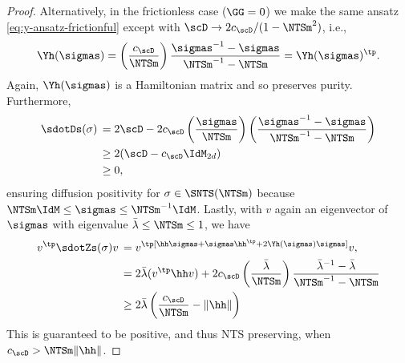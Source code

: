 \documentclass{article}
\numberwithin{equation}{section}
\begin{document}
\begin{proof}
Alternatively, in the frictionless case ($\GG = 0$) we make the same ansatz \eqref{eq:y-ansatz-frictionful} except with
$\scD \to 2 c_{\scD}/(1-\NTSm^{2} )$, i.e., 
\begin{align}\label{eq:y-ansatz-frictionless}
    \Yh(\sigmas) = \left(\frac{c_{\scD}}{\NTSm}\right)\frac{\sigmas^{-1} - \sigmas}{\NTSm^{-1} - \NTSm} = \Yh(\sigmas)^\tp.
\end{align}
Again, $\Yh(\sigmas)$ is a Hamiltonian matrix and so preserves purity. Furthermore,
\begin{align}
    \sdotDs (\sigma) \,
    &= 2 \scD - 2c_{\scD}\left(\frac{\sigmas}{\NTSm}\right)\left(\frac{\sigmas^{-1} - \sigmas}{\NTSm^{-1} - \NTSm}\right)\\
    &\ge 2(\scD - c_{\scD} \IdM_{2d})\\
    &\ge 0,
\end{align}
ensuring diffusion positivity for $\sigma\in\SNTS(\NTSm)$ because $\NTSm \IdM \le \sigmas \le \NTSm^{-1} \IdM$. Lastly, with $v$ again an eigenvector of $\sigmas$ with eigenvalue $\bar{\lambda}\le \NTSm \le 1$, we have
\begin{align}
    v^\tp\sdotZs(\sigma)v \, 
    &= v^\tp [\hh \sigmas + \sigmas \hh^\tp +  2\Yh(\sigmas)\sigmas  ] v, \\
    &= 2\bar{\lambda} (v^\tp \hh v) +  2c_{\scD}\left(\frac{\bar{\lambda}}{\NTSm}\right)\frac{\bar{\lambda}^{-1} - \bar{\lambda}}{\NTSm^{-1} - \NTSm}\\\
    &\ge 2\bar{\lambda}\left(\frac{c_{\scD}}{\NTSm} -  \|\hh\|\right)
\end{align}
This is guaranteed to be positive, and thus NTS preserving, when $c_{\scD} > \NTSm \|\hh\|$.
\end{proof}
\end{document}
